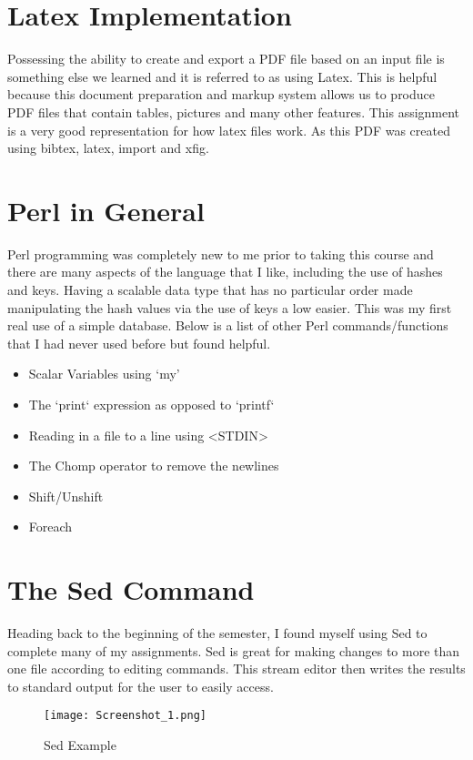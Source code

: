 \documentclass{article}
\begin{document}
\section{Latex Implementation}
Possessing the ability to create and export a PDF file based on an input file is something else we learned and it is referred to as using Latex. This is helpful because this document preparation and markup system allows us to produce PDF files that contain tables, pictures and many other features. This assignment is a very good representation for how latex files work. As this PDF was created using bibtex, latex, import and xfig. 

\section{Perl in General}
Perl programming was completely new to me prior to taking this course and there are many aspects of the language that I like, including the use of hashes and keys. Having a scalable data type that has no particular order made manipulating the hash values via the use of keys a low easier. This was my first real use of a simple database. Below is a list of other Perl commands/functions that I had never used before but found helpful.\citep{theTextBook}

\begin{itemize}
    \item Scalar Variables using ‘my’
    \item The `print` expression as opposed to `printf`
    \item Reading in a file to a line using <STDIN>
    \item The Chomp operator to remove the newlines
    \item Shift/Unshift
    \item Foreach
\end{itemize}


\section{The Sed Command}
Heading back to the beginning of the semester, I found myself using Sed to complete many of my assignments. Sed is great for making changes to more than one file according to editing commands. This stream editor then writes the results to standard output for the user to easily access. \citep{GNUwebsite}

\begin{figure}[h!]
\centering
\texttt{[image: Screenshot\_1.png]}
\caption{Sed Example}
\label{fig:Sed Example}
\end{figure} 
\end{document}
